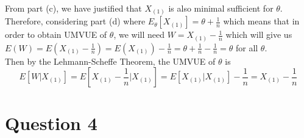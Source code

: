 \documentclass[a4paper,11pt]{article}
\begin{document}
\begin{enumerate}[(a)]
		\\ From part (c), we have justified that $X_{(1)}$ is also minimal sufficient for $\theta$.
		\\Therefore, considering part (d) where $E_{\theta}[X_{(1)}] = \theta +\frac{1}{n}$ which means that in order to obtain UMVUE of $\theta$, we will need $W = X_{(1)}-\frac{1}{n}$ which will give us $E(W) = E(X_{(1)}-\frac{1}{n}) = E(X_{(1)})-\frac{1}{n} = \theta +\frac{1}{n}-\frac{1}{n} = \theta$ for all $\theta$.
		\\Then by the Lehmann-Scheffe Theorem, the UMVUE of $\theta$ is 
		\[E[W|X_{(1)}]= E[X_{(1)}-\frac{1}{n} |X_{(1)}] = E[X_{(1)}|X_{(1)}]-\frac{1}{n} = X_{(1)}-\frac{1}{n} 
		\]
\end{enumerate}
\section{Question 4}
\end{document}
